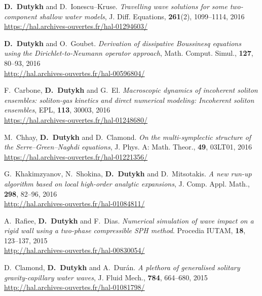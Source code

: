 \begin{etaremune}
  \item \textbf{D.~Dutykh} and D.~Ionescu--Kruse. \textit{Travelling wave solutions for some two-component shallow water models}, J. Diff. Equations, \textbf{261}(2), 1099--1114, 2016 \\ %
  \url{https://hal.archives-ouvertes.fr/hal-01294603/}
  
  \item \textbf{D.~Dutykh} and O.~Goubet. \textit{Derivation of dissipative Boussinesq equations using the Dirichlet-to-Neumann operator approach}, Math. Comput. Simul., \textbf{127}, 80--93, 2016 \\ %
  \url{http://hal.archives-ouvertes.fr/hal-00596804/}
  
  \item F.~Carbone, \textbf{D.~Dutykh} and G.~El. \textit{Macroscopic dynamics of incoherent soliton ensembles: soliton-gas kinetics and direct numerical modeling: Incoherent soliton ensembles}, EPL, \textbf{113}, 30003, 2016 \\ %
  \url{https://hal.archives-ouvertes.fr/hal-01248680/}
  
  \item M.~Chhay, \textbf{D.~Dutykh} and D.~Clamond. \textit{On the multi-symplectic structure of the Serre--Green--Naghdi equations}, J. Phys. A: Math. Theor., \textbf{49}, 03LT01, 2016 \\ %
  \url{https://hal.archives-ouvertes.fr/hal-01221356/}
  
  \item G.~Khakimzyanov, N.~Shokina, \textbf{D.~Dutykh} and D.~Mitsotakis. \textit{A new run-up algorithm based on local high-order analytic expansions}, J. Comp. Appl. Math., \textbf{298}, 82--96, 2016 \\ %
  \url{http://hal.archives-ouvertes.fr/hal-01084811/}
  
  
  \item A.~Rafiee, \textbf{D.~Dutykh} and F.~Dias. \textit{Numerical simulation of wave impact on a rigid wall using a two-phase compressible SPH method}. Procedia IUTAM, \textbf{18}, 123--137, 2015 \\ %
  \url{http://hal.archives-ouvertes.fr/hal-00830054/}

  \item D.~Clamond, \textbf{D.~Dutykh} and A.~Dur\'an. \textit{A plethora of generalised solitary gravity-capillary water waves}, J. Fluid Mech., \textbf{784}, 664--680, 2015 \\ %
  \url{http://hal.archives-ouvertes.fr/hal-01081798/}
  

\end{etaremune}
